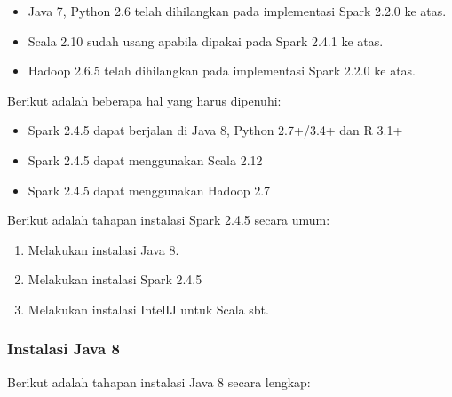 \begin{itemize}
\item Java 7, Python 2.6 telah dihilangkan pada implementasi Spark 2.2.0 ke atas.
\item Scala 2.10 sudah usang apabila dipakai pada Spark 2.4.1 ke atas.
\item Hadoop 2.6.5 telah dihilangkan pada implementasi Spark 2.2.0 ke atas.
\end{itemize}

\noindent Berikut adalah beberapa hal yang harus dipenuhi:

\begin{itemize}
\item Spark 2.4.5 dapat berjalan di Java 8, Python 2.7+/3.4+ dan R 3.1+ 
\item Spark 2.4.5 dapat menggunakan Scala 2.12
\item Spark 2.4.5 dapat menggunakan Hadoop 2.7
\end{itemize}

\noindent Berikut adalah tahapan instalasi Spark 2.4.5 secara umum:

\begin{enumerate}
\item Melakukan instalasi Java 8.
\item Melakukan instalasi Spark 2.4.5
\item Melakukan instalasi IntelIJ untuk Scala sbt.
\end{enumerate}

\newpage
\subsubsection{Instalasi Java 8}
\noindent Berikut adalah tahapan instalasi Java 8 secara lengkap:

